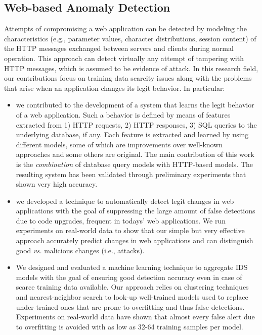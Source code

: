 \subsection{Web-based Anomaly Detection} Attempts of compromising a web application can be detected by modeling the characteristics (e.g., parameter values, character distributions, session content) of the \ac{HTTP} messages exchanged between servers and clients during normal operation. This approach can detect virtually any attempt of tampering with \ac{HTTP} messages, which is assumed to be evidence of attack. In this research field, our contributions focus on training data scarcity issues along with the problems that arise when an application changes its legit behavior. In particular:

\begin{itemize}
\item we contributed to the development of a system that learns the legit behavior of a web application. Such a behavior is defined by means of features extracted from 1) HTTP requests, 2) HTTP responses, 3) SQL queries to the underlying database, if any. Each feature is extracted and learned by using different models, some of which are improvements over well-known approaches and some others are original. The main contribution of this work is the \emph{combination} of database query models with HTTP-based models. The resulting system has been validated through preliminary experiments that shown very high accuracy.
\item we developed a technique to automatically detect legit changes in web applications with the goal of suppressing the large amount of false detections due to code upgrades, frequent in todays' web applications. We run experiments on real-world data to show that our simple but very effective approach accurately predict changes in web applications and can distinguish good \emph{vs.} malicious changes (i.e., attacks).
\item We designed and evaluated a machine learning technique to aggregate \ac{IDS} models with the goal of ensuring good detection accuracy even in case of scarce training data available. Our approach relies on clustering techniques and nearest-neighbor search to look-up well-trained models used to replace under-trained ones that are prone to overfitting and thus false detections. Experiments on real-world data have shown that almost every false alert due to overfitting is avoided with as low as 32-64 training samples per model.
\end{itemize}

